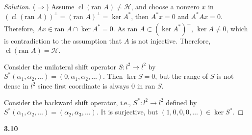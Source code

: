 \documentclass[a4paper, 12pt]{article}
\newcommand{\ran}{\textrm{ran }}
\theoremstyle{Mydefinition}
\theoremstyle{Mytheorem}
\DeclareMathOperator{\cl}{cl}
\begin{document}
\begin{proof}[Solution]
($\Rightarrow$) Assume $\cl(\ran A)\neq \mathscr{H}$, and choose a nonzero $x$ in $(\cl(\ran A))^\perp = (\ran A)^\perp = \ker A^*$, then $A^* x = 0$ and $A^* A x = 0$. Therefore, $Ax\in \ran A \cap \ker A^* = 0$. As $\ran A\subset (\ker A^*)^\perp$, $\ker A\neq 0$, which is contradiction to the assumption that $A$ is not injective. Therefore, $\cl(\ran A) = \mathscr{H}$.

Consider the unilateral shift operator $S:l^2\rightarrow l^2$ by $S^*(\alpha_1, \alpha_2, \ldots) = (0, \alpha_1, \alpha_2, \ldots)$. Then $\ker S = 0$, but the range of $S$ is not dense in $l^2$ since first coordinate is always $0$ in $\ran S$.

Consider the backward shift operator, i.e., $S^*:l^2\rightarrow l^2$ defined by $S^*(\alpha_1, \alpha_2, \ldots) = (\alpha_2, \alpha_3, \ldots)$. It is surjective, but $(1,0,0,0,\ldots)\in \ker S^*$.
\end{proof}



\noindent \textbf{3.10}
\end{document}
